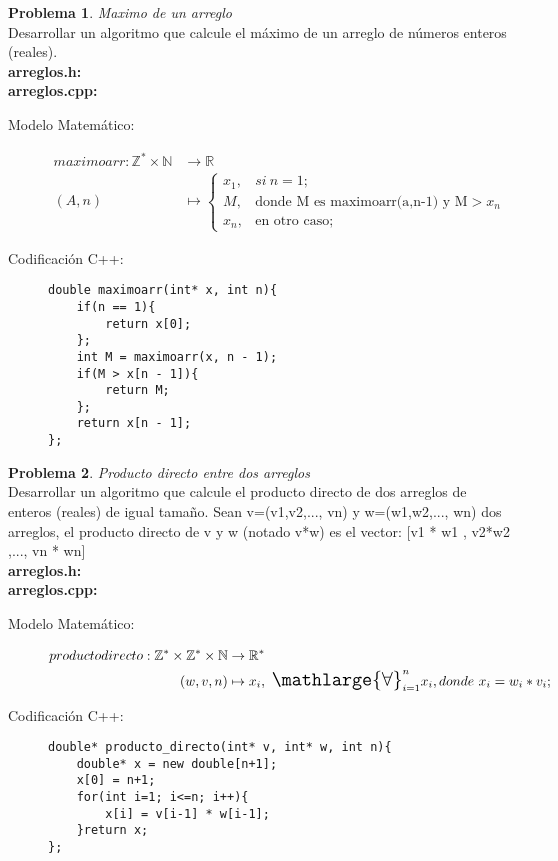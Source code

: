 \documentclass{article}
\theoremstyle{plain}
\theoremstyle{definition}
\newtheorem{problem}{Problema}
\begin{document}
\begin{problem} \emph{Maximo de un arreglo}\\
Desarrollar un algoritmo que calcule el máximo de un arreglo de números enteros (reales).\\
\textbf{arreglos.h:}\ \\
\textbf{arreglos.cpp:}\ 
%
\begin{description}
\item[Modelo Matemático:]
%
\begin{align*}
maximoarr:\mathbb{Z}^*\times\mathbb{N} &\to \mathbb{R}\\
(A,n) &\mapsto 
\begin{cases}
x_1,& si\ n=1;\\
M,& \text{donde M es maximoarr(a,n-1) y M}>x_n\\
x_n,& \text{en otro caso;}
\end{cases}
\end{align*}
%
\item[Codificación \textsf{C++}:]\hfill
%
\begin{verbatim}
double maximoarr(int* x, int n){
    if(n == 1){
        return x[0];
    };
    int M = maximoarr(x, n - 1);
    if(M > x[n - 1]){
        return M;
    };
    return x[n - 1];
};
\end{verbatim}
\end{description}
\end{problem}

\begin{problem} \emph{Producto directo entre dos arreglos}\\
Desarrollar un algoritmo que calcule el producto directo de dos arreglos de enteros (reales) de igual tamaño. Sean v=(v1,v2,..., vn) y w=(w1,w2,..., wn) dos arreglos, el producto directo de v y w (notado v*w) es el vector: [v1 * w1 , v2*w2 ,..., vn * wn]\\
\textbf{arreglos.h:}\ \\
\textbf{arreglos.cpp:}\ 
%
\begin{description}
\item[Modelo Matemático:]
%
\begin{align*}
producto directo: \mathbb{Z}^*\times\mathbb{Z}^*\times\mathbb{N} &\to \mathbb{R}^*\\
(w,v,n) &\mapsto x_i,\ {\mathlarger{\mathlarger{\mathlarge{\forall}}}}_{i=1}^{n}x_i, donde\ x_i=w_i*v_i;
\end{align*}
%
\item[Codificación \textsf{C++}:]\hfill
%
\begin{verbatim}
double* producto_directo(int* v, int* w, int n){
    double* x = new double[n+1];
    x[0] = n+1;
    for(int i=1; i<=n; i++){
        x[i] = v[i-1] * w[i-1];
    }return x;
};
\end{verbatim}
\end{description}
\end{problem}
\end{document}
